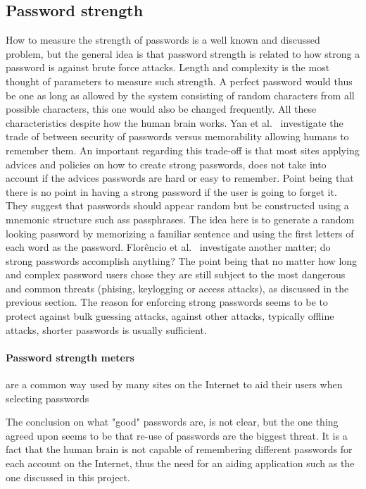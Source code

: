 \subsection{Password strength}\label{password-strength}
How to measure the strength of passwords is a well known and discussed problem, but the general idea is that password strength is related to how strong a password is against brute force attacks. Length and complexity is the most thought of parameters to measure such strength. A perfect password would thus be one as long as allowed by the system consisting of random characters from all possible characters, this one would also be changed frequently. All these characteristics despite how the human brain works. Yan et al.~\cite{memorability_yan} investigate the trade of between security of passwords versus memorability allowing humans to remember them. An important regarding this trade-off is that most sites applying advices and policies on how to create strong passwords, does not take into account if the advices passwords are hard or easy to remember. Point being that there is no point in having a strong password if the user is going to forget it. They suggest that passwords should appear random but be constructed using a  mnemonic structure such ass passphrases. The idea here is to generate a random looking password by memorizing a familiar sentence and using the first letters of each word as the password. Florêncio et al.~\cite{strong-pws_florencio} investigate another matter; do strong passwords accomplish anything? The point being that no matter how long and complex password users chose they are still subject to the most dangerous and common threats (phising, keylogging or access attacks), as discussed in the previous section. The reason for enforcing strong passwords seems to be to protect against bulk guessing attacks, against other attacks, typically offline attacks, shorter passwords is usually sufficient. 
\paragraph{Password strength meters} are a common way used by many sites on the Internet to aid their users when selecting passwords

The conclusion on what "good" passwords are, is not clear, but the one thing agreed upon seems to be that re-use of passwords are the biggest threat. It is a fact that the human brain is not capable of remembering different passwords for each account on the Internet, thus the need for an aiding application such as the one discussed in this project. 



